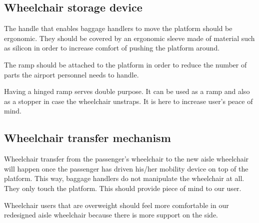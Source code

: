 \subsection*{Wheelchair storage device}

\begin{list}{-}{}
  \item The handle that enables baggage handlers to move the platform should be ergonomic. They should be covered by an ergonomic sleeve made of material such as silicon in order to increase comfort of pushing the platform around.
  \item The ramp should be attached to the platform in order to reduce the number of parts the airport personnel needs to handle.
  \item Having a hinged ramp serves double purpose. It can be used as a ramp and also as a stopper in case the wheelchair unstraps. It is here to increase user's peace of mind.
\end{list}

\subsection*{Wheelchair transfer mechanism}

\begin{list}{-}{}
  \item Wheelchair transfer from the passenger's wheelchair to the new aisle wheelchair will happen once the passenger has driven his/her mobility device on top of the platform. This way, baggage handlers do not manipulate the wheelchair at all. They only touch the platform. This should provide piece of mind to our user.
  \item Wheelchair users that are overweight should feel more comfortable in our redesigned aisle wheelchair because there is more support on the side.
\end{list}


